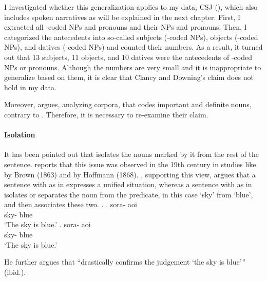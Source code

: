 I investigated whether this generalization applies to
my data, CSJ (), which also includes spoken narratives as will be explained in the next chapter.
First, I extracted all -coded NPs and pronouns and their  NPs and pronouns.
Then, I categorized the antecedents into
so-called subjects (-coded NPs),
objects (-coded NPs), and datives (-coded NPs) and
counted their numbers.
As a result,
it turned out that
13 subjects, 11 objects, and 10 datives were the antecedents of -coded NPs or pronouns.
Although the numbers are very small and it is inappropriate to generalize based on them,
it is clear that
Clancy and Downing's claim does not hold in my data.

Moreover,  argues, analyzing corpora, that
 codes important and definite nouns, contrary to .
Therefore, it is necessary to re-examine their claim.


\paragraph{Isolation}


It has been pointed out that
 isolates the nouns marked by it from the rest of the sentence.
 reports that this issue was observed in the 19th century
in studies like  by Brown (1863) and
 by Hoffmann (1868).
, supporting this view,
argues that a sentence with  as in \Next[a] expresses a unified situation,
whereas a sentence with  as in \Next[b] isolates or separates
the noun from the predicate,
in this case
 `sky' from  `blue',
and then associates these two.
%
\ex.
 \ag. sora- aoi \\
      sky- blue \\
      `The sky is blue.'
 \bg. sora- aoi \\
      sky- blue \\
      `The sky is blue.'

He further argues that
 ``drastically confirms the  judgement `the sky is blue'{''} (ibid.).

